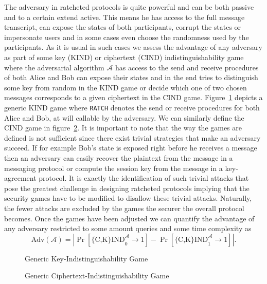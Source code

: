 \documentclass[11pt,a4paper,twoside,openright,bibliography=totoc]{scrbook}
\renewcommand{\t}{\text} %
\begin{document}
The adversary in ratcheted protocols is quite powerful and can be both
passive and to a certain extend active. This means he has access to
the full message transcript, can expose the states of both
participants, corrupt the states or impersonate users and in some
cases even choose the randomness used by the participants. As it is
usual in such cases we assess the advantage of any adversary as part
of some key (KIND) or ciphertext (CIND) indistinguishability game
where the adversarial algorithm $\mathcal{A}$ has access to the send
and receive procedures of both Alice and Bob can expose their states
and in the end tries to distinguish some key from random in the KIND
game or decide which one of two chosen messages corresponds to a given
ciphertext in the CIND game.
Figure~\ref{fig:kind} depicts a generic KIND game where \texttt{RATCH} denotes
the send or receive procedures for both Alice and Bob, at will callable by the
adversary. We can similarly define the CIND game in figure~\ref{fig:cind}.
It is important to note that the way the games are defined is
not sufficient since there exist trivial strategies that make an adversary
succeed. If for example Bob's state is exposed right before he
receives a message then an adversary can easily recover the plaintext
from the message in a messaging protocol or compute the session key
from the message in a key-agreement protocol. It is exactly the
identification of such trivial attacks that pose the greatest
challenge in designing ratcheted protocols implying that the security games
have to be modified to disallow these trivial attacks. Naturally,
the fewer attacks are excluded by the games the securer the overall
protocol becomes. Once the games have been adjusted we can
quantify the advantage of any adversary restricted to some amount queries
and some time complexity as
\[
  \t{Adv}(\mathcal{A}) = \left| \Pr \left[ \t{\{C,K\}IND}_0^\mathcal{A} \rightarrow 1 \right] -
                                \Pr \left[ \t{\{C,K\}IND}_1^\mathcal{A} \rightarrow 1 \right]
                         \right|.
\]

\begin{figure}[ht]
  \centering
  \setlength{\fboxsep}{10pt}
  \scalebox{0.8}{%
    \fbox{%
      
    }
  }
  \caption{Generic Key-Indistinguishability Game}
  \label{fig:kind}
\end{figure}

\begin{figure}[ht]
  \centering
  \setlength{\fboxsep}{10pt}
  \scalebox{0.8}{%
    \fbox{%
      
    }
  }
  \caption{Generic Ciphertext-Indistinguishability Game}
  \label{fig:cind}
\end{figure}
\end{document}
